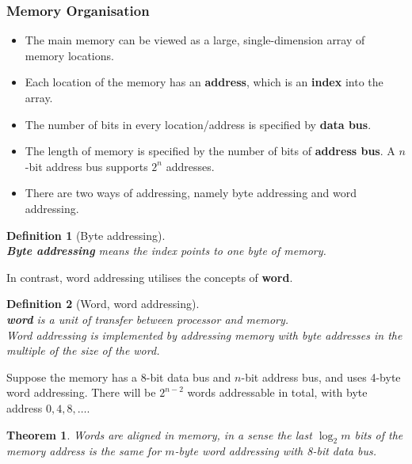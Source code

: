 \documentclass[12pt]{article}
\newtheorem{definition}{Definition}[section]
\newtheorem{theorem}{Theorem}[section]
\theoremstyle{definition}
\begin{document}
\subsubsection{Memory Organisation}
\begin{itemize}
\item The main memory can be viewed as a large, single-dimension array of memory locations.
\item Each location of the memory has an \textbf{address}, which is an \textbf{index} into the array.
\item The number of bits in every location/address is specified by \textbf{data bus}.
\item The length of memory is specified by the number of bits of \textbf{address bus}. A $n$-bit address bus supports $2^n$ addresses.
\item There are two ways of addressing, namely byte addressing and word addressing.
\end{itemize}
\begin{definition}[Byte addressing]
\hfill\\\normalfont \textbf{Byte addressing} means the index points to \textit{one} byte of memory.
\end{definition}
In contrast, word addressing utilises the concepts of \textbf{word}.
\begin{definition}[Word, word addressing]
\hfill\\\normalfont \textbf{word} is a unit of transfer between processor and memory.\\Word addressing is implemented by addressing memory with byte addresses in the multiple of the size of the word.\end{definition}
Suppose the memory has a 8-bit data bus and $n$-bit address bus, and uses 4-byte word addressing. There will be $2^{n-2}$ words addressable in total, with byte address $0,4,8,\ldots$.\\
\begin{theorem}\normalfont Words are aligned in memory, in a sense the last $\log_2 m$ bits of the memory address is the same for $m$-byte word addressing with 8-bit data bus.\end{theorem}
\end{document}

